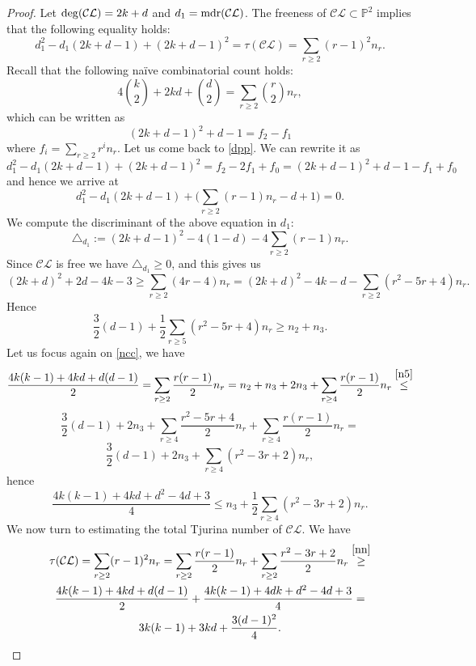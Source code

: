 \documentclass[11pt]{article}
\theoremstyle{plain}
\theoremstyle{definition}
\theoremstyle{remark}
\begin{document}
\begin{proof}
Let ${\rm deg}(\mathcal{CL}) = 2k+d$ and $d_{1} = {\rm mdr}(\mathcal{CL})$. The freeness of $\mathcal{CL} \subset \mathbb{P}^{2}$ implies that the following equality holds:
\begin{equation}
\label{dpp}
d_{1}^{2} - d_{1}(2k+d-1) +(2k+d-1)^2 = \tau(\mathcal{CL}) = \sum_{r\geq 2}(r-1)^{2}n_{r}.
\end{equation}
Recall that the following na\"ive combinatorial count holds:
\begin{equation}
\label{ncc}
 4\binom{k}{2}+2kd +\binom{d}{2} = \sum_{r\geq 2}\binom{r}{2}n_{r},
\end{equation}
which can be written as
\begin{equation}
(2k+d-1)^{2}+d-1 = f_{2}-f_{1}
\end{equation}
where $f_{i}=\sum_{r\geq 2}r^{i}n_{r}$.
Let us come back to \eqref{dpp}. We can rewrite it as
\[d_{1}^{2}-d_{1}(2k+d-1)+(2k+d-1)^{2} = f_{2}-2f_{1}+f_{0} = (2k+d-1)^{2}+d-1-f_{1}+f_{0}\]
and hence we arrive at
\[d_{1}^{2}-d_{1}(2k+d-1) + \bigg(\sum_{r\geq 2}(r-1)n_{r}-d+1 \bigg) = 0.\]
We compute the discriminant of the above equation in $d_{1}$: 
\begin{equation}
\label{cruc}
\triangle_{d_{1}} := (2k+d-1)^2 - 4(1-d) -4\sum_{r\geq 2}(r-1)n_{r}.
\end{equation}
Since $\mathcal{CL}$ is free we have $\triangle_{d_{1}}\geq 0$, and this gives us
\[(2k+d)^2 + 2d-4k-3 \geq \sum_{r\geq 2}(4r-4)n_{r}= (2k+d)^2-4k-d-\sum_{r\geq 2}(r^{2}-5r+4)n_{r}.\]
Hence
\begin{equation}
\label{n5}
\frac{3}{2}(d-1) + \frac{1}{2}\sum_{r\geq 5}(r^{2}-5r+4)n_{r} \geq n_{2}+n_{3}.
\end{equation}
Let us focus again on \eqref{ncc}, we have
\[\frac{4k(k-1)+4kd+d(d-1)}{2} = \sum_{r\geq 2}\frac{r(r-1)}{2}n_{r} = n_{2} + n_{3} + 2n_{3} + \sum_{r\geq 4} \frac{r(r-1)}{2}n_{r} \stackrel{\eqref{n5}}{\leq} \]
\[\frac{3}{2}(d-1) + 2n_{3} + \sum_{r\geq 4}\frac{r^{2}-5r+4}{2}n_{r} + \sum_{r\geq 4}\frac{r(r-1)}{2}n_{r} = \]
\[\frac{3}{2}(d-1)+2n_{3} + \sum_{r\geq 4}(r^{2}-3r+2)n_{r},\]
hence
\begin{equation}
\label{nn}
\frac{4k(k-1)+4kd+d^{2}-4d+3}{4}\leq n_{3} + \frac{1}{2}\sum_{r\geq 4}(r^{2}-3r+2)n_{r}.
\end{equation}
We now turn to estimating the total Tjurina number of $\mathcal{CL}$. We have
\begin{multline*}
\tau(\mathcal{CL}) = \sum_{r\geq 2}(r-1)^{2}n_{r} = \sum_{r\geq 2}\frac{r(r-1)}{2}n_{r} + \sum_{r \geq 2}\frac{r^{2}-3r+2}{2}n_{r} \stackrel{\eqref{nn}}{\geq} \\ \frac{4k(k-1)+4kd+d(d-1)}{2} + \frac{4k(k-1)+4dk+d^2-4d+3}{4} = \\ 3k(k-1)+3kd + \frac{3(d-1)^{2}}{4}. 

\end{multline*}
\end{proof}
\end{document}
